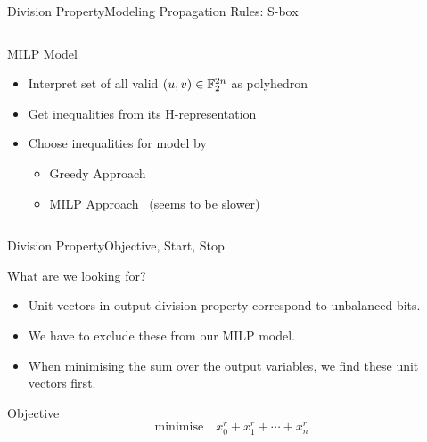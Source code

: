 \begin{frame}{Division Property}{Modeling Propagation Rules: S-box}
\begin{columns}
\begin{column}{0.575\textwidth}
\begin{block}{MILP Model}
\begin{itemize}
                \item Interpret set of all valid $(u, v) \in \mathbb{F}_2^{2n}$ as polyhedron
                \item Get inequalities from its H-representation
                \item Choose inequalities for model by
                    \begin{itemize}
                        \item Greedy Approach~\cite{AC:SHWQMS14}
                        \item MILP Approach~\cite{SecITC:SasTod17} (seems to be slower)
                    \end{itemize}
            \end{itemize}
            \end{block}
        \end{column}
    \end{columns}
\end{frame}


\begin{frame}{Division Property}{Objective, Start, Stop}
    \begin{block}{What are we looking for?}
        \begin{itemize}
            \item Unit vectors in output division property correspond to unbalanced bits.
            \item We have to exclude these from our MILP model.
            \item When minimising the sum over the output variables, we find these unit vectors first.
        \end{itemize}
    \end{block}
    \begin{block}{Objective}
        \begin{equation*}
            \mathrm{minimise} \quad x_0^r + x_1^r + \cdots + x_n^r
        \end{equation*}
    \end{block}
\end{frame}

